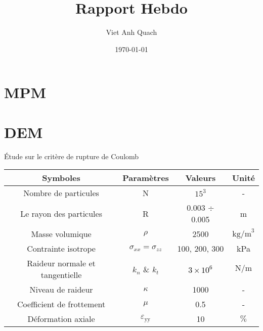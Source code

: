 \documentclass[10pt]{beamer}
\title{Rapport Hebdo}
\author{Viet Anh Quach}
\institute{3SR}
\date{\today}
\begin{document}
\begin{frame}
    \titlepage
\end{frame}


\section{MPM}



\section{DEM}
\begin{frame}{Étude sur le critère de rupture de Coulomb}
    \begin{table}
        \centering
        \begin{tabular}{|c|c|c|c|}
            \hline
            \textbf{Symboles}               & \textbf{Paramètres}         & \textbf{Valeurs}                          & \textbf{Unité}  \\
            \hline
            Nombre de particules            & N                           & $15^3$                                    & -               \\
            \hline
            Le rayon des particules         & R                           & 0.003 $\div$ 0.005                        & m               \\
            \hline
            Masse volumique                 & $\rho$                      & 2500                                      & $\text{kg/m}^3$ \\
            \hline
            Contrainte isotrope             & $\sigma_{xx} = \sigma_{zz}$ & 100, 200, 300                             & kPa             \\
            \hline
            Raideur normale et tangentielle & $k_n$ \& $k_t$              & \textcolor{black}{$3 \times 10^6$}        & $\text{N/m}$    \\
            \hline
            Niveau de raideur               & $\kappa$                    & 1000                                      & -               \\
            \hline
            Coefficient de frottement       & $\mu$                       & 0.5                                       & -               \\
            \hline
            Déformation axiale              & $\varepsilon_{\text{yy}}$   & 10                                        & $\%$            \\

\end{tabular}
\end{table}
\end{frame}
\end{document}
